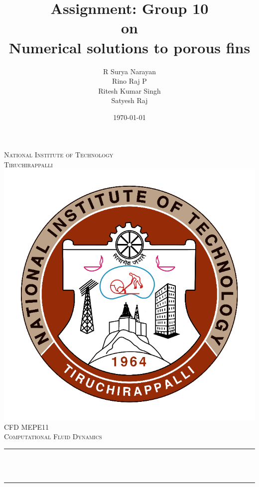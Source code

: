 \documentclass[12pt]{article}
\title{Assignment: Group 10 \\ on \\ \vspace{0.5cm} Numerical solutions to porous fins}								%
\author{R Surya Narayan \\ Rino Raj P \\Ritesh Kumar Singh \\ Satyesh Raj }								%
\date{\today}											%
\makeatletter
\let\thetitle\@title
\let\thedate\@date
\makeatother
\begin{document}
\vspace{-2cm}

\begin{titlepage}
	\centering
    \textsc{\LARGE National Institute of Technology \\ \vspace{0.5cm} Tiruchirappalli}\\[1.5 cm]	%
    \includegraphics[scale = 0.2]{nitt_logo.png}\\[1.0 cm]	%
	\textsc{\Large CFD MEPE11}\\[0.5 cm]				%
	\textsc{\large Computational Fluid Dynamics}\\[0.5 cm]				%
	\rule{\linewidth}{0.2 mm} \\[0.4 cm]
	{ \huge \bfseries \thetitle}\\
	\rule{\linewidth}{0.2 mm} \\[1.5 cm]
	
    {\large \thedate}\\[1 cm]
    

\end{titlepage}
\end{document}
